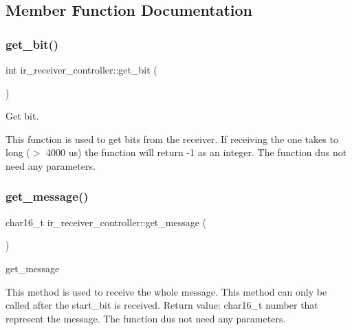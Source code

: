 \subsection{Member Function Documentation}
\hypertarget{classir__receiver__controller_a6cc44257482f6e2f463714f7b9c3784a}{}\label{classir__receiver__controller_a6cc44257482f6e2f463714f7b9c3784a} 
\subsubsection{\texorpdfstring{get\+\_\+bit()}{get\_bit()}}
{\footnotesize\ttfamily int ir\+\_\+receiver\+\_\+controller\+::get\+\_\+bit (\begin{DoxyParamCaption}{ }\end{DoxyParamCaption})\hspace{0.3cm}{\ttfamily [inline]}}



Get bit. 

This function is used to get bits from the receiver. If receiving the one takes to long ($>$ 4000 us) the function will return -\/1 as an integer. The function dus not need any parameters. \hypertarget{classir__receiver__controller_aaef8491c3e15d003898a4f2bfb2069d6}{}\label{classir__receiver__controller_aaef8491c3e15d003898a4f2bfb2069d6} 
\subsubsection{\texorpdfstring{get\+\_\+message()}{get\_message()}}
{\footnotesize\ttfamily char16\+\_\+t ir\+\_\+receiver\+\_\+controller\+::get\+\_\+message (\begin{DoxyParamCaption}{ }\end{DoxyParamCaption})\hspace{0.3cm}{\ttfamily [inline]}}



get\+\_\+message 

This method is used to receive the whole message. This method can only be called after the start\+\_\+bit is received. Return value\+: char16\+\_\+t number that represent the message. The function dus not need any parameters. \hypertarget{classir__receiver__controller_ad98b3cc0cb528a0b40e52d900638f3ec}{}\label{classir__receiver__controller_ad98b3cc0cb528a0b40e52d900638f3ec} 
